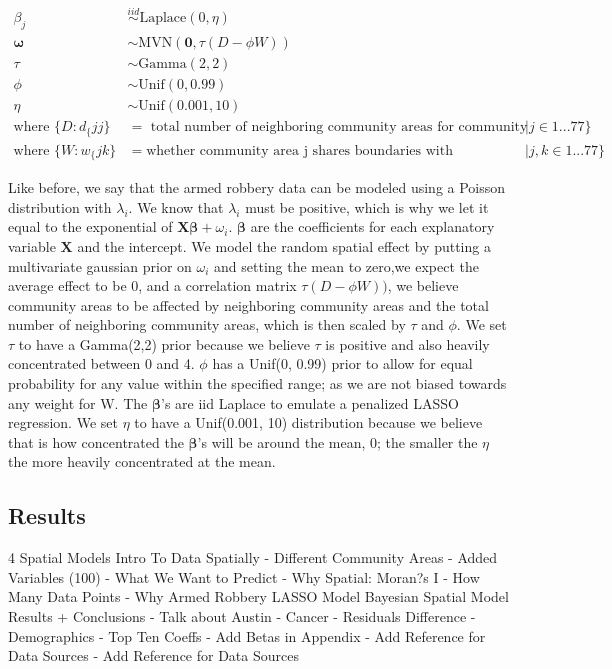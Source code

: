 \documentclass{article} %
\begin{document}
$$
\begin{aligned}
\beta_j &\overset{iid}{\sim} \text{Laplace}(0, \eta)\\
\boldsymbol{\omega} &\sim \text{MVN}(\mathbf{0}, \tau(D -\phi W))\\
\tau &\sim \text{Gamma}(2,2)\\
\phi &\sim \text{Unif}(0,0.99)\\
\eta &\sim \text{Unif}(0.001,10)\\
\text{where } \{D:d_\{jj\} &= \text{ total number of neighboring community areas for community area j}| j \in 1...77\} \\  
\text{where } \{W:w_\{jk\} &= \text{whether community area j shares boundaries with community area k}| j,k \in 1...77\}
\end{aligned}
$$

Like before, we say that the armed robbery data can be modeled using a Poisson distribution with $\lambda_i$. We know that $\lambda_i$ must be positive, which is why we let it equal to the exponential of $\mathbf{X}\boldsymbol{\beta} + \omega_i$. $\boldsymbol{\beta}$ are the coefficients for each explanatory variable $\mathbf{X}$ and the intercept. We model the random spatial effect by putting a multivariate gaussian prior on $\omega_i$ and setting the mean to zero,we expect the average effect to be 0, and a correlation matrix $\tau(D -\phi W))$, we believe community areas to be affected by neighboring community areas and the total number of neighboring community areas, which is then scaled by $\tau$ and $\phi$. We set $\tau$ to have a Gamma(2,2) prior because we believe $\tau$ is positive and also heavily concentrated between 0 and 4. $\phi$ has a Unif(0, 0.99) prior to allow for equal probability for any value within the specified range; as we are not biased towards any weight for W. The $\boldsymbol{\beta}$’s are iid Laplace to emulate a penalized LASSO regression. We set $\eta$ to have a Unif(0.001, 10) distribution because we believe that is how concentrated the $\boldsymbol{\beta}$'s will be around the mean, 0; the smaller the $\eta$ the more heavily concentrated at the mean. 



\subsection{Results}


4 Spatial Models
Intro To Data Spatially - Different Community Areas - Added Variables (100) - What We Want to
Predict - Why Spatial: Moran?s I - How Many Data Points - Why Armed Robbery
LASSO Model
Bayesian Spatial Model
Results + Conclusions - Talk about Austin - Cancer - Residuals Difference - Demographics - Top
Ten Coeffs
- Add Betas in Appendix - Add Reference for Data Sources
- Add Reference for Data Sources 
\end{document}
